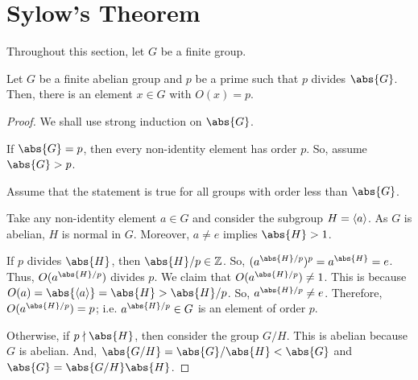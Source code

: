 \documentclass[11pt]{penrose}
\begin{document}

\section{Sylow's Theorem}
Throughout this section, let $G$ be a finite group.

\begin{nthm}[Cauchy]
    Let $G$ be a finite abelian group and $p$ be a prime such that $p$ divides $\abs{G}$. Then, there is an element $x \in G$ with $O(x) = p$.
\end{nthm}
\begin{proof}
    We shall use strong induction on $\abs{G}$.

    If $\abs{G} = p$, then every non-identity element has order $p$. So, assume $\abs{G} > p$.

    Assume that the statement is true for all groups with order less than $\abs{G}$.

    Take any non-identity element $a \in G$ and consider the subgroup $H = \langle a\rangle$. As $G$ is abelian, $H$ is normal in $G$. Moreover, $a \neq e$ implies $\abs{H} > 1$.


    If $p$ divides $\abs{H}$, then $\abs{H}/p \in \Z$. So, $(a^{\abs{H}/p})^{p} = a^{\abs{H}} = e$. Thus, $O(a^{\abs{H}/p})$ divides $p$. We claim that $O(a^{\abs{H}/p}) \neq 1$. This is because $O(a) = \abs{\cyclic{a}} = \abs{H} > \abs{H}/p$. So, $a^{\abs{H}/p} \neq e$. Therefore, $O(a^{\abs{H}/p}) = p$; i.e. $a^{\abs{H}/p} \in G$ is an element of order $p$.

    Otherwise, if $p \nmid \abs{H}$, then consider the group $G/H$. This is abelian because $G$ is abelian. And, $\abs{G/H} = \abs{G} / \abs{H} < \abs{G}$ and $\abs{G} = \abs{G/H} \abs{H}$.


\end{proof}
\end{document}
